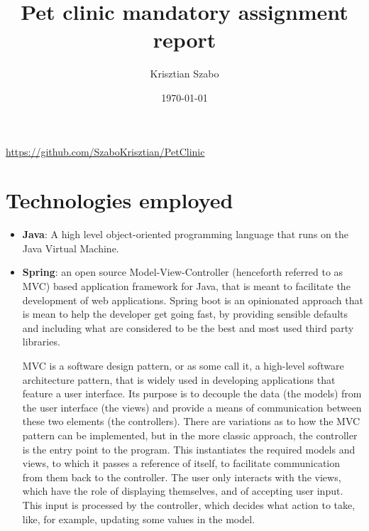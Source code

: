 \documentclass[12pt, a4paper]{article}
\title{Pet clinic mandatory assignment report}
\author{Krisztian Szabo}
\date{\today{}}
\begin{document}
\maketitle
\begin{center}
\url{https://github.com/SzaboKrisztian/PetClinic}
\end{center}
\newpage

\tableofcontents
{}
\newpage

\section{Technologies employed}
\begin{itemize}
\item \textbf{Java}: A high level object-oriented programming language that runs on the Java Virtual Machine.
\item \textbf{Spring}: an open source Model-View-Controller (henceforth referred to as MVC) based application framework for Java, that is meant to facilitate the development of web applications. Spring boot is an opinionated approach that is mean to help the developer get going fast, by providing sensible defaults and including what are considered to be the best and most used third party libraries.

MVC is a software design pattern, or as some call it, a high-level software architecture pattern, that is widely used in developing applications that feature a user interface. Its purpose is to decouple the data (the models) from the user interface (the views) and provide a means of communication between these two elements (the controllers). There are variations as to how the MVC pattern can be implemented, but in the more classic approach, the controller is the entry point to the program. This instantiates the required models and views, to which it passes a reference of itself, to facilitate communication from them back to the controller. The user only interacts with the views, which have the role of displaying themselves, and of accepting user input. This input is processed by the controller, which decides what action to take, like, for example, updating some values in the model.


\end{itemize}
\end{document}
